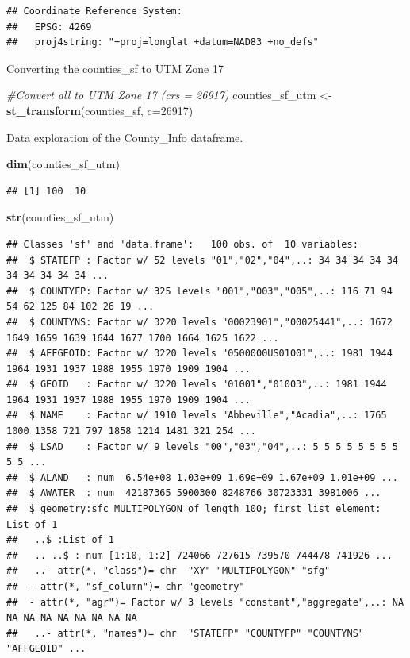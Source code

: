 \documentclass[12pt,]{article}
\newenvironment{Shaded}{\begin{snugshade}}{\end{snugshade}}
\newcommand{\KeywordTok}[1]{\textcolor[rgb]{0.13,0.29,0.53}{\textbf{#1}}}
\newcommand{\DataTypeTok}[1]{\textcolor[rgb]{0.13,0.29,0.53}{#1}}
\newcommand{\DecValTok}[1]{\textcolor[rgb]{0.00,0.00,0.81}{#1}}
\newcommand{\StringTok}[1]{\textcolor[rgb]{0.31,0.60,0.02}{#1}}
\newcommand{\CommentTok}[1]{\textcolor[rgb]{0.56,0.35,0.01}{\textit{#1}}}
\newcommand{\NormalTok}[1]{#1}
\begin{document}
\begin{verbatim}
## Coordinate Reference System:
##   EPSG: 4269 
##   proj4string: "+proj=longlat +datum=NAD83 +no_defs"
\end{verbatim}

Converting the counties\_sf to UTM Zone 17

\begin{Shaded}
\begin{Highlighting}[]
\CommentTok{#Convert all to UTM Zone 17 (crs = 26917)}
\NormalTok{counties_sf_utm <-}\StringTok{ }\KeywordTok{st_transform}\NormalTok{(counties_sf, }\DataTypeTok{c=}\DecValTok{26917}\NormalTok{)}
\end{Highlighting}
\end{Shaded}

Data exploration of the County\_Info dataframe.

\begin{Shaded}
\begin{Highlighting}[]
\KeywordTok{dim}\NormalTok{(counties_sf_utm)}
\end{Highlighting}
\end{Shaded}

\begin{verbatim}
## [1] 100  10
\end{verbatim}

\begin{Shaded}
\begin{Highlighting}[]
\KeywordTok{str}\NormalTok{(counties_sf_utm)}
\end{Highlighting}
\end{Shaded}

\begin{verbatim}
## Classes 'sf' and 'data.frame':   100 obs. of  10 variables:
##  $ STATEFP : Factor w/ 52 levels "01","02","04",..: 34 34 34 34 34 34 34 34 34 34 ...
##  $ COUNTYFP: Factor w/ 325 levels "001","003","005",..: 116 71 94 54 62 125 84 102 26 19 ...
##  $ COUNTYNS: Factor w/ 3220 levels "00023901","00025441",..: 1672 1649 1659 1639 1644 1677 1700 1664 1625 1622 ...
##  $ AFFGEOID: Factor w/ 3220 levels "0500000US01001",..: 1981 1944 1964 1931 1937 1988 1955 1970 1909 1904 ...
##  $ GEOID   : Factor w/ 3220 levels "01001","01003",..: 1981 1944 1964 1931 1937 1988 1955 1970 1909 1904 ...
##  $ NAME    : Factor w/ 1910 levels "Abbeville","Acadia",..: 1765 1000 1358 721 797 1858 1214 1481 321 254 ...
##  $ LSAD    : Factor w/ 9 levels "00","03","04",..: 5 5 5 5 5 5 5 5 5 5 ...
##  $ ALAND   : num  6.54e+08 1.03e+09 1.69e+09 1.67e+09 1.01e+09 ...
##  $ AWATER  : num  42187365 5900300 8248766 30723331 3981006 ...
##  $ geometry:sfc_MULTIPOLYGON of length 100; first list element: List of 1
##   ..$ :List of 1
##   .. ..$ : num [1:10, 1:2] 724066 727615 739570 744478 741926 ...
##   ..- attr(*, "class")= chr  "XY" "MULTIPOLYGON" "sfg"
##  - attr(*, "sf_column")= chr "geometry"
##  - attr(*, "agr")= Factor w/ 3 levels "constant","aggregate",..: NA NA NA NA NA NA NA NA NA
##   ..- attr(*, "names")= chr  "STATEFP" "COUNTYFP" "COUNTYNS" "AFFGEOID" ...
\end{verbatim}
\end{document}
